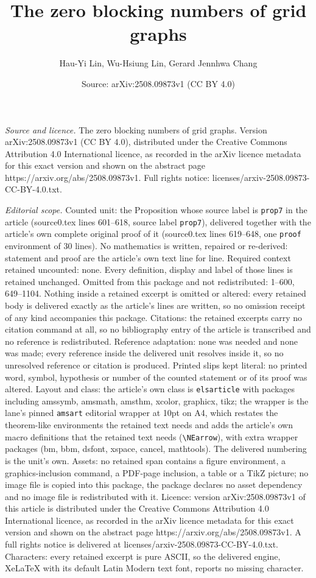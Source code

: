 \documentclass[10pt,a4paper]{amsart}
\title[The zero blocking numbers of grid graphs]{The zero blocking numbers of grid graphs}
\author{Hau-Yi Lin, Wu-Hsiung Lin, Gerard Jennhwa Chang}
\date{Source: arXiv:2508.09873v1 (CC BY 4.0)}
\begin{document}
\maketitle

\noindent\emph{Source and licence.} The zero blocking numbers of grid graphs. Version arXiv:2508.09873v1 (CC BY 4.0), distributed under the Creative Commons Attribution 4.0 International licence, as recorded in the arXiv licence metadata for this exact version and shown on the abstract page https://arxiv.org/abs/2508.09873v1. Full rights notice: licenses/arxiv-2508.09873-CC-BY-4.0.txt.\par\smallskip

\noindent\textit{Editorial scope.} Counted unit: the Proposition whose source label is \texttt{prop7} in the article (source0.tex lines 601--618, source label \texttt{prop7}), delivered together with the article's own complete original proof of it (source0.tex lines 619--648, one \texttt{proof} environment of 30 lines). No mathematics is written, repaired or re-derived: statement and proof are the article's own text line for line. Required context retained uncounted: none. Every definition, display and label of those lines is retained unchanged. Omitted from this package and not redistributed: 1--600, 649--1104. Nothing inside a retained excerpt is omitted or altered: every retained body is delivered exactly as the article's lines are written, so no omission receipt of any kind accompanies this package. Citations: the retained excerpts carry no citation command at all, so no bibliography entry of the article is transcribed and no reference is redistributed. Reference adaptation: none was needed and none was made; every reference inside the delivered unit resolves inside it, so no unresolved reference or citation is produced. Printed slips kept literal: no printed word, symbol, hypothesis or number of the counted statement or of its proof was altered. Layout and class: the article's own class is \texttt{elsarticle} with packages including amssymb, amsmath, amsthm, xcolor, graphicx, tikz; the wrapper is the lane's pinned \texttt{amsart} editorial wrapper at 10pt on A4, which restates the theorem-like environments the retained text needs and adds the article's own macro definitions that the retained text needs (\texttt{\textbackslash NEarrow}), with extra wrapper packages (bm, bbm, dsfont, xspace, cancel, mathtools). The delivered numbering is the unit's own. Assets: no retained span contains a figure environment, a graphics-inclusion command, a PDF-page inclusion, a table or a TikZ picture; no image file is copied into this package, the package declares no asset dependency and no image file is redistributed with it. Licence: version arXiv:2508.09873v1 of this article is distributed under the Creative Commons Attribution 4.0 International licence, as recorded in the arXiv licence metadata for this exact version and shown on the abstract page https://arxiv.org/abs/2508.09873v1. A full rights notice is delivered at licenses/arxiv-2508.09873-CC-BY-4.0.txt. Characters: every retained excerpt is pure ASCII, so the delivered engine, XeLaTeX with its default Latin Modern text font, reports no missing character.
\end{document}
